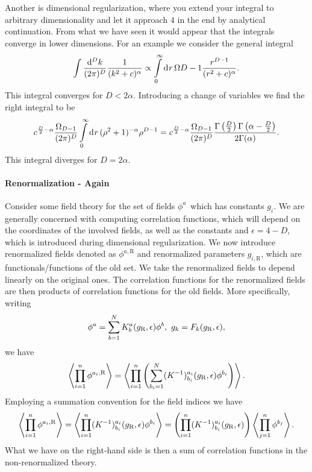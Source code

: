 Another is dimensional regularization, where you extend your integral to arbitrary dimensionality and let it approach $4$ in the end by analytical continuation. From what we have seen it would appear that the integrals converge in lower dimensions. For an example we consider the general integral
\begin{align*}
	\int\limits_{}^{}\frac{\dd[D]{k}}{(2\pi)^{D}}\frac{1}{(k^{2} + c)^{\alpha}} \propto \int\limits_{0}^{\infty}\dd[]{r}\Omega{D - 1}\frac{r^{D - 1}}{(r^{2} + c)^{\alpha}}.
\end{align*}
This integral converges for $D < 2\alpha$. Introducing a change of variables we find the right integral to be
\begin{align*}
	c^{\frac{D}{2} - \alpha}\frac{\Omega_{D - 1}}{(2\pi)^{D}}\int\limits_{0}^{\infty}\dd[]{r}(\rho^{2} + 1)^{-\alpha}\rho^{D - 1} = c^{\frac{D}{2} - \alpha}\frac{\Omega_{D - 1}}{(2\pi)^{D}}\frac{\Gamma\left(\frac{D}{2}\right)\Gamma\left(\alpha - \frac{D}{2}\right)}{2\Gamma(\alpha)}.
\end{align*}
This integral diverges for $D = 2\alpha$.

\paragraph{Renormalization - Again}
Consider some field theory for the set of fields $\phi^{a}$ which has constants $g_{i}$. We are generally concerned with computing correlation functions, which will depend on the coordinates of the involved fields, as well as the constants and $\epsilon = 4 - D$, which is introduced during dimensional regularization. We now introduce renormalized fields denoted as $\phi^{a, \text{R}}$ and renormalized parameters $g_{i, \text{R}}$, which are functionals/functions of the old set. We take the renormalized fields to depend linearly on the original ones. The correlation functions for the renormalized fields are then products of correlation functions for the old fields. More specifically, writing
\begin{align*}
	\phi^{a} = \sum\limits_{b = 1}^{N}K_{b}^{a}(g_{\text{R}}, \epsilon)\phi^{b},\ g_{k} = F_{k}(g_{\text{R}}, \epsilon),
\end{align*}
we have
\begin{align*}
	\expval{\prod\limits_{i = 1}^{n}\phi^{a_{i}, \text{R}}} = \expval{\prod\limits_{i = 1}^{n}\left(\sum\limits_{b_{i} = 1}^{N}(K^{-1})_{b_{i}}^{a_{i}}(g_{\text{R}}, \epsilon)\phi^{b_{i}}\right)}.
\end{align*}
Employing a summation convention for the field indices we have
\begin{align*}
	\expval{\prod\limits_{i = 1}^{n}\phi^{a_{i}, \text{R}}} = \expval{\prod\limits_{i = 1}^{n}(K^{-1})_{b_{i}}^{a_{i}}(g_{\text{R}}, \epsilon)\phi^{b_{i}}} = \left(\prod\limits_{i = 1}^{n}(K^{-1})_{b_{i}}^{a_{i}}(g_{\text{R}}, \epsilon)\right)\expval{\prod\limits_{j = 1}^{n}\phi^{b_{j}}}.
\end{align*}
What we have on the right-hand side is then a sum of correlation functions in the non-renormalized theory.

